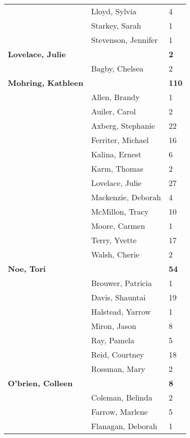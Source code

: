 \documentclass{article}\usepackage[]{graphicx}\usepackage[]{color}
\begin{document}
{\begin{longtable} { >{\raggedright}p{}|p{}p{}}
   & Lloyd, Sylvia & 4 \\ 
   & Starkey, Sarah & 1 \\ 
   & Stevenson, Jennifer & 1 \\ 
   \rowcolor[gray]{0.90}\textbf{Lovelace, Julie} &  & \hspace{2cm}\textbf{2} \\ 
   \rowcolor[gray]{0.90} & Bagby, Chelsea & 2 \\ 
   \rowcolor[gray]{0.90}\textbf{Mohring, Kathleen} &  & \hspace{2cm}\textbf{110} \\ 
   & Allen, Brandy & 1 \\ 
   & Auiler, Carol & 2 \\ 
   & Axberg, Stephanie & 22 \\ 
   \rowcolor[gray]{0.90} & Ferriter, Michael & 16 \\ 
   \rowcolor[gray]{0.90} & Kalina, Ernest & 6 \\ 
   \rowcolor[gray]{0.90} & Karm, Thomas & 2 \\ 
   & Lovelace, Julie & 27 \\ 
   & Mackenzie, Deborah & 4 \\ 
   & McMillon, Tracy & 10 \\ 
   \rowcolor[gray]{0.90} & Moore, Carmen & 1 \\ 
   \rowcolor[gray]{0.90} & Terry, Yvette & 17 \\ 
   \rowcolor[gray]{0.90} & Walsh, Cherie & 2 \\ 
  \textbf{Noe, Tori} &  & \hspace{2cm}\textbf{54} \\ 
   & Brouwer, Patricia & 1 \\ 
   & Davis, Shauntai & 19 \\ 
   \rowcolor[gray]{0.90} & Halstead, Yarrow & 1 \\ 
   \rowcolor[gray]{0.90} & Miron, Jason & 8 \\ 
   \rowcolor[gray]{0.90} & Ray, Pamela & 5 \\ 
   & Reid, Courtney & 18 \\ 
   & Rossman, Mary & 2 \\ 
  \textbf{O'brien, Colleen} &  & \hspace{2cm}\textbf{8} \\ 
   \rowcolor[gray]{0.90} & Coleman, Belinda & 2 \\ 
   \rowcolor[gray]{0.90} & Farrow, Marlene & 5 \\ 
   \rowcolor[gray]{0.90} & Flanagan, Deborah & 1 \\ 

\end{longtable}}
\end{document}
